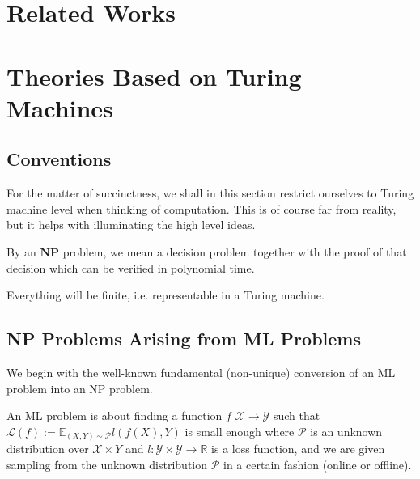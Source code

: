\documentclass[11pt, oneside]{article}   	%
\theoremstyle{definition}
\begin{document}
\section{Related Works}



\section{Theories Based on Turing Machines}

\subsection{Conventions}

For the matter of succinctness, we shall in this section restrict ourselves to Turing machine level when thinking of computation. This is of course far from reality, but it helps with illuminating the high level ideas.

By an $\textbf{NP}$ problem, we mean a decision problem together with the proof of that decision which can be verified in polynomial time.

Everything will be finite, i.e. representable in a Turing machine.

\subsection{NP Problems Arising from ML Problems}
\begin{center}
\end{center}

We begin with the well-known fundamental (non-unique) conversion of an ML problem into an NP problem.

An ML problem is about finding a function $f$ $\mathcal{X}\to \mathcal{Y}$ such that $\mathscr{L}(f):=\mathbb{E}_{(X,Y)\sim \mathcal{P}}l(f(X), Y)$ is small enough where $\mathcal{P}$ is an unknown distribution over $\mathcal{X}\times Y$ and $l:\mathcal{Y}\times \mathcal{Y} \to \mathbb{R}$ is a loss function, and we are given sampling from the unknown distribution $\mathcal{P}$ in a certain fashion (online or offline).
\end{document}
